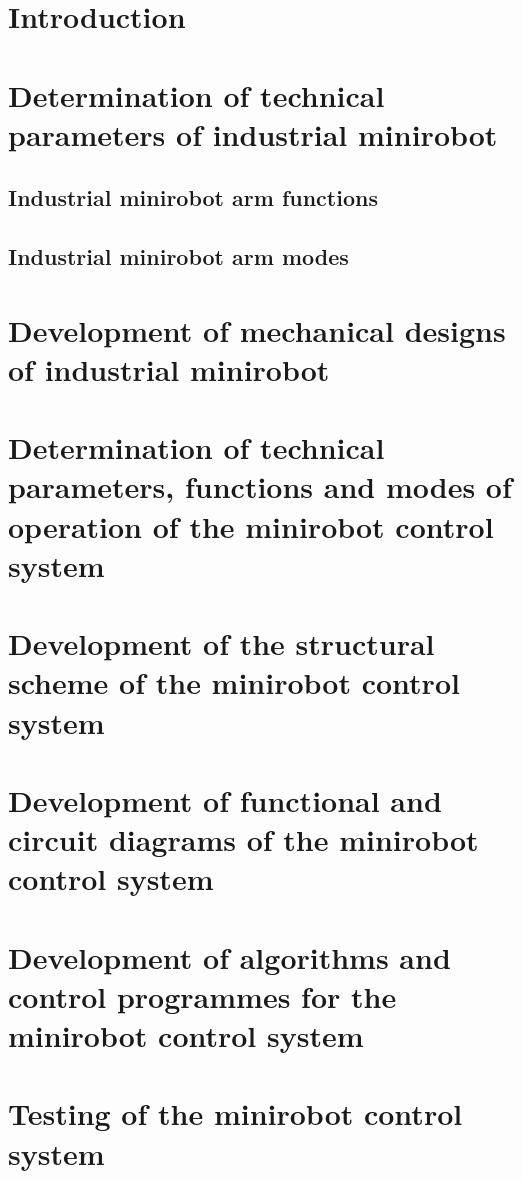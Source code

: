 
\section*{Introduction}



\section{Determination of technical parameters of industrial minirobot}

\subsection{Industrial minirobot arm functions}
\subsection{Industrial minirobot arm modes}


\section{Development of mechanical designs of industrial minirobot}

\section{Determination of technical parameters, functions and modes of operation of the minirobot control system }

\section{Development of the structural scheme of the minirobot control system}

\section{Development of functional and circuit diagrams of the minirobot control system}


\section{Development of algorithms and control programmes for the minirobot control system}


\section{Testing of the minirobot control system }

% 
